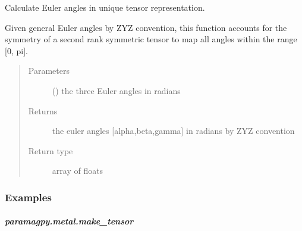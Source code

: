 \documentclass[a4paper,10pt,english,openany,oneside]{sphinxmanual}
\begin{document}
\begin{fulllineitems}
\label{\detokenize{reference/generated/paramagpy.metal.unique_eulers:paramagpy.metal.unique_eulers}}
\sphinxAtStartPar
Calculate Euler angles in unique tensor representation.

\sphinxAtStartPar
Given general Euler angles by ZYZ convention, this function accounts for
the symmetry of a second rank symmetric tensor to map all angles within
the range {[}0, pi{]}.
\begin{quote}\begin{description}
\item[{Parameters}] \leavevmode
\sphinxAtStartPar
{} () \textendash{} the three Euler angles in radians

\item[{Returns}] \leavevmode
\sphinxAtStartPar
{} \textendash{} the euler angles {[}alpha,beta,gamma{]} in radians
by ZYZ convention

\item[{Return type}] \leavevmode
\sphinxAtStartPar
array of floats

\end{description}\end{quote}
\subsubsection*{Examples}

\begin{sphinxVerbatim}[commandchars=\\\{\}]
  \PYG{p}{[}\PYG{p}{]}
\end{sphinxVerbatim}

\end{fulllineitems}



\subparagraph{paramagpy.metal.make\_tensor}
\label{\detokenize{reference/generated/paramagpy.metal.make_tensor:paramagpy-metal-make-tensor}}\label{\detokenize{reference/generated/paramagpy.metal.make_tensor::doc}}
\end{document}
